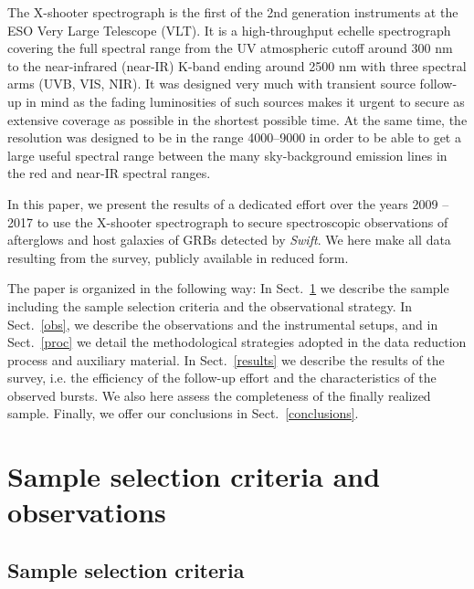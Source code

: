 \documentclass{aa}    %
\begin{document}
The X-shooter spectrograph \citep{Vernet2011} is the first of the 2nd generation
instruments at the ESO Very Large Telescope (VLT). It is a high-throughput
echelle spectrograph covering the full spectral range from the UV atmospheric
cutoff around 300 nm to the near-infrared (near-IR) K-band ending around 2500 nm
with three spectral arms (UVB, VIS, NIR). It was designed very much with
transient source follow-up in mind as the fading luminosities of such sources
makes it urgent to secure as extensive coverage as possible in the shortest
possible time. At the same time, the resolution was designed to be in the range
4000--9000 in order to be able to get a large useful spectral range between the
many sky-background emission lines in the red and near-IR spectral ranges. 

In this paper, we present the results of a dedicated effort over the years 2009
-- 2017 to use the X-shooter spectrograph to secure spectroscopic observations
of afterglows and host galaxies of GRBs detected by {\it Swift}. We here make
all data resulting from the survey, publicly available in reduced form.

The paper is organized in the following way: In Sect.~\ref{sample} we describe
the sample including the sample selection criteria and the observational
strategy. In Sect.~\ref{obs}, we describe the observations and the instrumental
setups, and in Sect.~\ref{proc} we detail the methodological strategies adopted
in the data reduction process and auxiliary material. In Sect.~\ref{results} we
describe the results of the survey, i.e. the efficiency of the follow-up effort
and the characteristics of the observed bursts. We also here assess the
completeness of the finally realized sample. Finally, we offer our conclusions
in Sect.~\ref{conclusions}.


\section{Sample selection criteria and observations}\label{sample}



\subsection{Sample selection criteria} \label{samplecrit}
\end{document}
